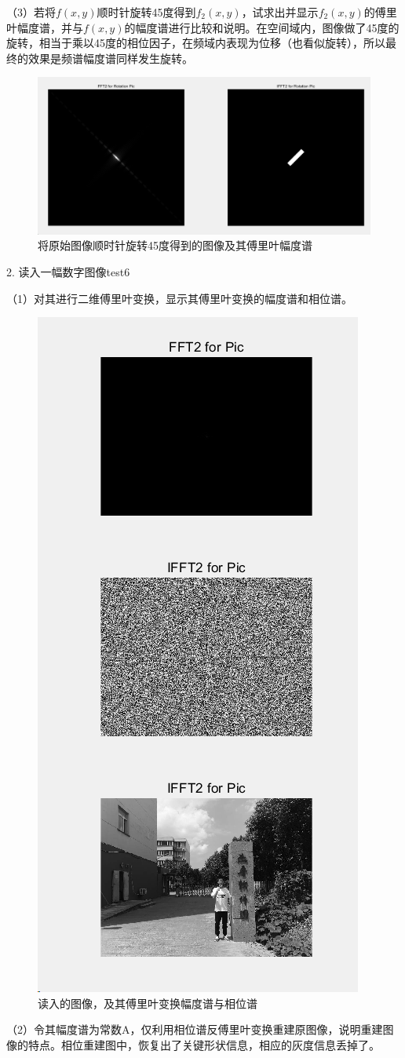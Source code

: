 \documentclass[UTF8]{article} %
\begin{document}
	（3）若将$f(x,y)$顺时针旋转45度得到$f_{2}(x,y)$，试求出并显示$f_{2}(x,y)$的傅里叶幅度谱，并与$f(x,y)$的幅度谱进行比较和说明。在空间域内，图像做了45度的旋转，相当于乘以45度的相位因子，在频域内表现为位移（也看似旋转），所以最终的效果是频谱幅度谱同样发生旋转。
	\begin{figure}[H]
		\centering
		\includegraphics[width=0.7\linewidth]{screenshot004}
		\caption{将原始图像顺时针旋转45度得到的图像及其傅里叶幅度谱}
		\label{fig:2-4}
	\end{figure}
	
	
	2. 读入一幅数字图像test6
	
	（1）对其进行二维傅里叶变换，显示其傅里叶变换的幅度谱和相位谱。
	\begin{figure}[H]
		\centering
		\includegraphics[width=0.4\linewidth]{screenshot006}
		\caption{读入的图像，及其傅里叶变换幅度谱与相位谱}
		\label{fig:2-5}
	\end{figure}
	
	
	（2）令其幅度谱为常数A，仅利用相位谱反傅里叶变换重建原图像，说明重建图像的特点。相位重建图中，恢复出了关键形状信息，相应的灰度信息丢掉了。
	
\end{document}
